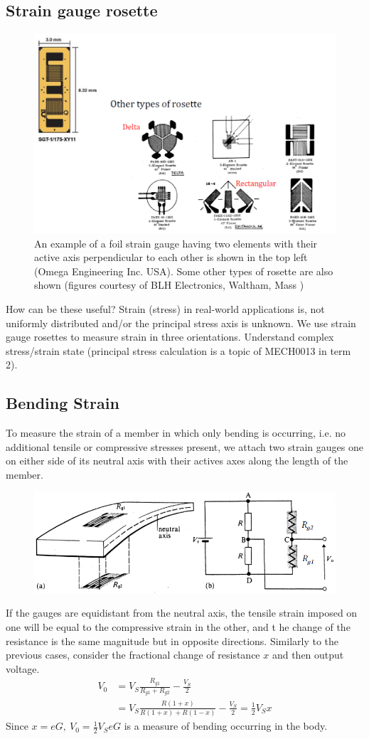 \documentclass[class=report, crop=false, 12pt,a4paper]{standalone}
\begin{document}
\subsection{Strain gauge rosette}
\begin{figure}[H]
  \centering
  \includegraphics[width = 0.8 \textwidth]{../img/diagram15.png}
  \caption{An example of a foil strain gauge having two elements with their active axis perpendicular to each other is shown in the top left (Omega Engineering Inc. USA). Some other types of rosette are also shown (figures courtesy of BLH Electronics, Waltham, Mass )}
\end{figure}
How can be these useful? Strain (stress) in real-world applications is, not uniformly distributed and/or the principal stress axis is unknown. We use strain gauge rosettes to measure strain in three orientations. Understand complex stress/strain state (principal stress calculation is a topic of MECH0013 in term 2).
\subsection{Bending Strain}
To measure the strain of a member in which only bending is occurring, i.e. no additional tensile or compressive stresses present, we attach two strain gauges one on either side of its neutral axis with their actives axes along the length of the member.
\begin{figure}[H]
  \centering
  \includegraphics[width = 0.8 \textwidth]{../img/diagram16.png}
\end{figure}
If the gauges are equidistant from the neutral axis, the tensile strain imposed on one will be equal to the compressive strain in the other, and t he change of the resistance is the same magnitude but in opposite directions. Similarly to the previous cases, consider the fractional change of resistance $x$ and then output voltage.
\begin{align}
  V_0 &= V_S \frac{R_{g1}}{R_{g1} + R_{g2}} - \frac{V_S}{2}\\
  &= V_S \frac{R(1+x)}{R(1+x) + R(1-x)} - \frac{V_S}{2} = \frac{1}{2} V_S x
\end{align}
Since $x=eG, \ V_0 = \frac{1}{2} V_S eG$ is a measure of bending occurring in the body.
\end{document}
